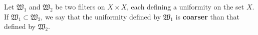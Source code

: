 Let $\mathfrak{W}_1$ and $\mathfrak{W}_2$ be two filters on $X \times X$, each defining a uniformity on the set $X$. If $\mathfrak{W}_1 \subset \mathfrak{W}_2$, we say that the uniformity defined by $\mathfrak{W}_1$ is \textbf{coarser} than that defined by $\mathfrak{W}_2$.
